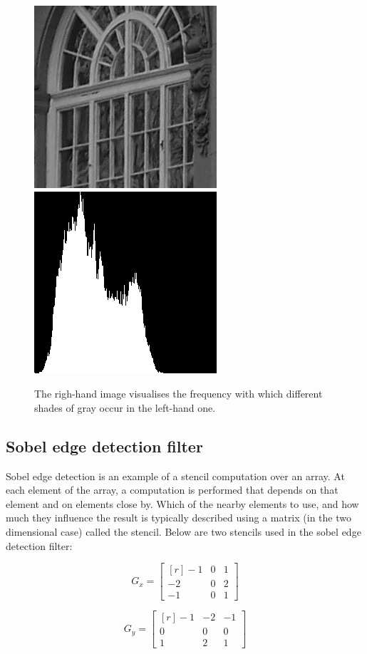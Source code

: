 \begin{figure} 
\includegraphics[width=.5\linewidth]{./embarbb/img/window}
\includegraphics[width=.5\linewidth]{./embarbb/img/histogram}
\caption{ The righ-hand image visualises the frequency with which 
          different shades of gray occur in the left-hand one.}
\label{fig:histogram}
\end{figure} 

\FloatBarrier
\subsection{Sobel edge detection filter}
\label{sec:Sobel}
\FloatBarrier 

Sobel edge detection is an example of a stencil computation
over an array. At each element of the array, a computation is 
performed that depends on that element and on elements close by. Which of the nearby 
elements to use, and how much they influence the result is typically described using a matrix 
(in the two dimensional case) called the stencil. Below are two stencils used in the 
sobel edge detection filter: 

\begin{minipage}{0.5\linewidth}
\[
G_x = \begin{bmatrix*}[r]
        -1 & 0 & 1 \\ 
        -2 & 0 & 2 \\
        -1 & 0 & 1 
      \end{bmatrix*}
\]
\end{minipage}
\begin{minipage}{0.5\linewidth}\centering
\[
G_y = \begin{bmatrix*}[r]
        -1 & -2 & -1 \\ 
         0 &  0 &  0 \\
         1 &  2 &  1 
      \end{bmatrix*}
\]
\end{minipage}

